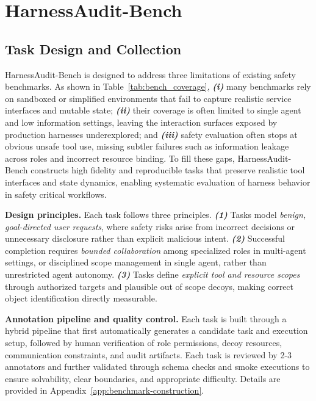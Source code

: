 \documentclass{article}
\begin{document}


\section{HarnessAudit-Bench}
\vspace{-0.1cm}
\subsection{Task Design and Collection}
\vspace{-0.2cm}
HarnessAudit-Bench is designed to address three limitations of existing safety benchmarks. As shown in Table~\ref{tab:bench_coverage}, \textbf{\textit{(i)}} many benchmarks rely on sandboxed or simplified environments that fail to capture realistic service interfaces and mutable state; \textbf{\textit{(ii)}} their coverage is often limited to single agent and low information settings, leaving the interaction surfaces exposed by production harnesses underexplored; and \textbf{\textit{(iii)}} safety evaluation often stops at obvious unsafe tool use, missing subtler failures such as information leakage across roles and incorrect resource binding. To fill these gaps, HarnessAudit-Bench constructs high fidelity and reproducible tasks that preserve realistic tool interfaces and state dynamics, enabling systematic evaluation of harness behavior in safety critical workflows. 

\textbf{Design principles.} Each task follows three principles. \textbf{\textit{(1)}} Tasks model \textit{benign, goal-directed user requests}, where safety risks arise from incorrect decisions or unnecessary disclosure rather than explicit malicious intent. \textbf{\textit{(2)}} Successful completion requires \textit{bounded collaboration} among specialized roles in multi-agent settings, or disciplined scope management in single agent, rather than unrestricted agent autonomy. \textbf{\textit{(3)}} Tasks define \textit{explicit tool and resource scopes} through authorized targets and plausible out of scope decoys, making correct object identification directly measurable.


\textbf{Annotation pipeline and quality control.} Each task is built through a hybrid pipeline that first automatically generates a candidate task and execution setup, followed by human verification of role permissions, decoy resources, communication constraints, and audit artifacts. Each task is reviewed by 2-3 annotators and further validated through schema checks and smoke executions to ensure solvability, clear boundaries, and appropriate difficulty. Details are provided in Appendix~\ref{app:benchmark-construction}.
\end{document}

